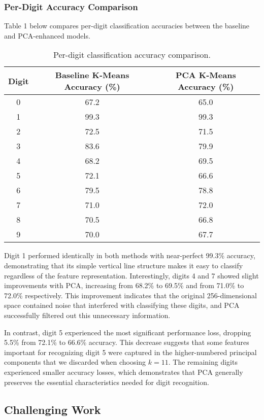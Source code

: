 \documentclass{article}
\begin{document}
\subsubsection{Per-Digit Accuracy Comparison}
Table 1 below compares per-digit classification accuracies between the baseline and PCA-enhanced models.
\begin{table}[H]
\centering
\caption{Per-digit classification accuracy comparison.}
\begin{tabular}{c|c|c}
\textbf{Digit} & \textbf{Baseline K-Means Accuracy (\%)} & \textbf{PCA K-Means Accuracy (\%)} \\
\hline
0 & 67.2 & 65.0 \\
1 & 99.3 & 99.3 \\
2 & 72.5 & 71.5 \\
3 & 83.6 & 79.9 \\
4 & 68.2 & 69.5 \\
5 & 72.1 & 66.6 \\
6 & 79.5 & 78.8 \\
7 & 71.0 & 72.0 \\
8 & 70.5 & 66.8 \\
9 & 70.0 & 67.7 \\
\end{tabular}
\end{table}
Digit 1 performed identically in both methods with near-perfect 99.3\% accuracy, demonstrating that its simple vertical line structure makes it easy to classify regardless of the feature representation. Interestingly, digits 4 and 7 showed slight improvements with PCA, increasing from 68.2\% to 69.5\% and from 71.0\% to 72.0\% respectively. This improvement indicates that the original 256-dimensional space contained noise that interfered with classifying these digits, and PCA successfully filtered out this unnecessary information.

In contrast, digit 5 experienced the most significant performance loss, dropping 5.5\% from 72.1\% to 66.6\% accuracy. This decrease suggests that some features important for recognizing digit 5 were captured in the higher-numbered principal components that we discarded when choosing $k = 11$. The remaining digits experienced smaller accuracy losses, which demonstrates that PCA generally preserves the essential characteristics needed for digit recognition.

\subsection{Challenging Work}
\end{document}
